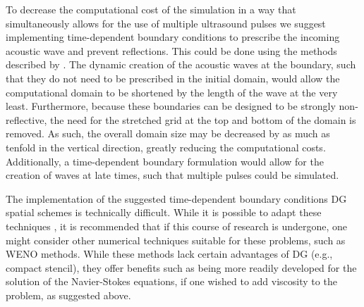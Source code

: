 \begin{itemize}
  To decrease the computational cost of the simulation in a way that
  simultaneously allows for the use of multiple ultrasound pulses we
  suggest implementing time-dependent boundary conditions to prescribe
  the incoming acoustic wave and prevent reflections. This could be
  done using the methods described by
  \cite{Thompson1987a,Thompson1990a}. The dynamic creation of the
  acoustic waves at the boundary, such that they do not need to be
  prescribed in the initial domain, would allow the computational
  domain to be shortened by the length of the wave at the very
  least. Furthermore, because these boundaries can be designed to be
  strongly non-reflective, the need for the stretched grid at the top
  and bottom of the domain is removed. As such, the overall domain
  size may be decreased by as much as tenfold in the vertical
  direction, greatly reducing the computational costs. Additionally, a
  time-dependent boundary formulation would allow for the creation of
  waves at late times, such that multiple pulses could be simulated.

  The implementation of the suggested time-dependent boundary
  conditions \ac{DG} spatial schemes is technically difficult. While
  it is possible to adapt these techniques \citep{Toulopoulos2011}, it
  is recommended that if this course of research is undergone, one
  might consider other numerical techniques suitable for these
  problems, such as \ac{WENO} methods. While these methods lack
  certain advantages of \ac{DG} (e.g., compact stencil), they offer
  benefits such as being more readily developed for the solution of
  the Navier-Stokes equations, if one wished to add viscosity to the
  problem, as suggested above.


\end{itemize}
